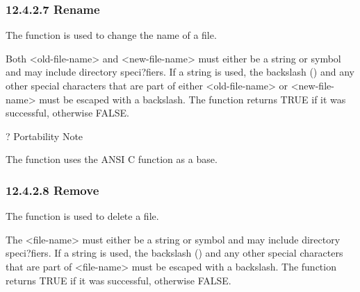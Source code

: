 \documentclass[letterpaper,10pt,english]{sphinxmanual}
\begin{document}
\subsubsection{12.4.2.7 Rename}
\label{\detokenize{actions:rename}}
The  function is used to change the name of a file.


\begin{sphinxVerbatim}[commandchars=\\\{\}]
  
\end{sphinxVerbatim}

Both \textless{}old-file-name\textgreater{} and \textless{}new-file-name\textgreater{} must either be a string or
symbol and may include directory speci?fiers. If a string is used, the
backslash () and any other special characters that are part of either
\textless{}old-file-name\textgreater{} or \textless{}new-file-name\textgreater{} must be escaped with a backslash. The
 function returns TRUE if it was successful, otherwise FALSE.

? Portability Note

The  function uses the ANSI C function  as a base.


\subsubsection{12.4.2.8 Remove}
\label{\detokenize{actions:remove}}
The  function is used to delete a file.


\begin{sphinxVerbatim}[commandchars=\\\{\}]
 
\end{sphinxVerbatim}

The \textless{}file-name\textgreater{} must either be a string or symbol and may include
directory speci?fiers. If a string is used, the backslash () and any
other special characters that are part of \textless{}file-name\textgreater{} must be escaped
with a backslash. The  function returns TRUE if it was
successful, otherwise FALSE.
\end{document}
